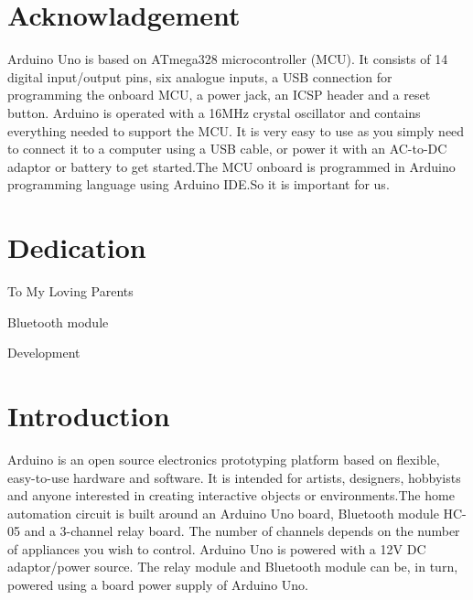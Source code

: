 \documentclass[10pt]{article}
\begin{document}
\section*{Acknowladgement}
\large Arduino Uno is based on ATmega328 microcontroller (MCU). It consists of 14 digital input/output pins, six analogue inputs, a USB connection for programming the onboard MCU, a power jack, an ICSP header and a reset button. \vspace*{0.5 cm}Arduino is operated with a 16MHz crystal oscillator and contains everything needed to support the MCU. It is very easy to use as you simply need to connect it to a computer using a USB cable, or power it with an AC-to-DC adaptor or battery to get started.\vspace*{0.5 cm}The MCU onboard is programmed in Arduino programming language using Arduino IDE.So it is important for us.
\cleardoublepage
\section*{\centering Dedication}
\large To My Loving Parents
\cleardoublepage
\listoffigures Bluetooth module\\
\cleardoublepage
\listoftables
Development 
\cleardoublepage
\tableofcontents
\thispagestyle{empty}
\cleardoublepage
{}
\setcounter{page}{1}
\section{Introduction}\label{sec:intro}
Arduino is an open source electronics prototyping platform based on flexible, easy-to-use hardware and software. It is intended for artists, designers, hobbyists and anyone interested in creating interactive objects or environments.\vspace*{0.5 cm}The home automation circuit is built around an Arduino Uno board, Bluetooth module HC-05 and a 3-channel relay board. The number of channels depends on the number of appliances you wish to control.\vspace*{0.5 cm} Arduino Uno is powered with a 12V DC adaptor/power source. The relay module and Bluetooth module can be, in turn, powered using a board power supply of Arduino Uno.
	\newpage
\end{document}
